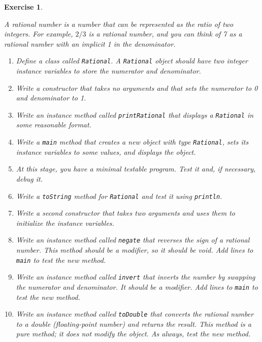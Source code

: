 \documentclass[12pt]{book}
\theoremstyle{exercise}
\newtheorem{exercise}{Exercise}[chapter]
\newcommand{\java}[1]{\verb"#1"}
\begin{document}
\begin{exercise}
\label{ex.rational}


A rational number is a number that can be represented as the ratio of two integers.
For example, $2/3$ is a rational number, and you can think of 7 as a rational number with an implicit 1 in the denominator.

\begin{enumerate}

\item Define a class called \java{Rational}.
A \java{Rational} object should have two integer instance variables to store the numerator and denominator.

\item Write a constructor that takes no arguments and that sets the numerator to 0 and denominator to 1.

\item Write an instance method called \java{printRational} that displays a \java{Rational} in some reasonable format.

\item Write a \java{main} method that creates a new object with type \java{Rational}, sets its instance variables to some values, and displays the object.

\item At this stage, you have a minimal testable program.
Test it and, if necessary, debug it.

\item Write a \java{toString} method for \java{Rational} and test it using \java{println}.

\item Write a second constructor that takes two arguments and uses them to initialize the instance variables.

\item Write an instance method called \java{negate} that reverses the sign of a rational number.
This method should be a modifier, so it should be void.
Add lines to \java{main} to test the new method.

\item Write an instance method called \java{invert} that inverts the number by swapping the numerator and denominator.
It should be a modifier.
Add lines to \java{main} to test the new method.

\item Write an instance method called \java{toDouble} that converts the rational number to a double (floating-point number) and returns the result.
This method is a pure method; it does not modify the object.
As always, test the new method.


\end{enumerate}
\end{exercise}
\end{document}
